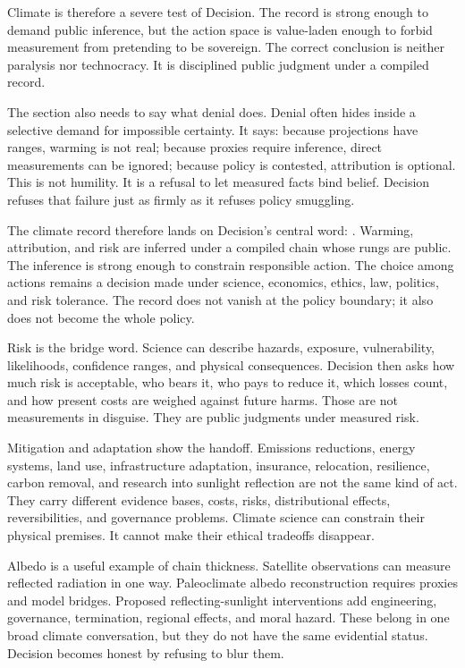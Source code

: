 Climate is therefore a severe test of Decision. The record is strong enough
to demand public inference, but the action space is value-laden enough to
forbid measurement from pretending to be sovereign. The correct conclusion is
neither paralysis nor technocracy. It is disciplined public judgment under a
compiled record.

The section also needs to say what denial does. Denial often hides inside a
selective demand for impossible certainty. It says: because projections have
ranges, warming is not real; because proxies require inference, direct
measurements can be ignored; because policy is contested, attribution is
optional. This is not humility. It is a refusal to let measured facts bind
belief. Decision refuses that failure just as firmly as it refuses policy
smuggling.

The climate record therefore lands on Decision's central word:
. Warming, attribution, and risk are inferred under a compiled
chain whose rungs are public. The inference is strong enough to constrain
responsible action. The choice among actions remains a decision made under
science, economics, ethics, law, politics, and risk tolerance. The record does
not vanish at the policy boundary; it also does not become the whole policy.

Risk is the bridge word. Science can describe hazards, exposure,
vulnerability, likelihoods, confidence ranges, and physical consequences.
Decision then asks how much risk is acceptable, who bears it, who pays to
reduce it, which losses count, and how present costs are weighed against
future harms. Those are not measurements in disguise. They are public
judgments under measured risk.

Mitigation and adaptation show the handoff. Emissions reductions, energy
systems, land use, infrastructure adaptation, insurance, relocation,
resilience, carbon removal, and research into sunlight reflection are not the
same kind of act. They carry different evidence bases, costs, risks,
distributional effects, reversibilities, and governance problems. Climate
science can constrain their physical premises. It cannot make their ethical
tradeoffs disappear.

Albedo is a useful example of chain thickness. Satellite observations can
measure reflected radiation in one way. Paleoclimate albedo reconstruction
requires proxies and model bridges. Proposed reflecting-sunlight interventions
add engineering, governance, termination, regional effects, and moral hazard.
These belong in one broad climate conversation, but they do not have the same
evidential status. Decision becomes honest by refusing to blur them.

